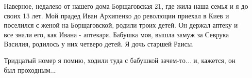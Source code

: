  
 
 
 
 


Наверное, недалеко от нашего дома Борщаговская 21, где жила наша семья и я до
своих 13 лет. Мой прадед Иван Архипенко до революции приехал в Киев и поселился
с женой на Борщаговской, родили троих детей. Он держал аптеку и все знали его,
как Ивана - аптекаря. Бабушка моя, вышла замуж за Севрука Василия, родилось у
них четверо детей. Я дочь старшей Раисы.

Тридцатый номер я помню, ходили туда с бабушкой зачем-то... и, кажется, он был
проходным...

